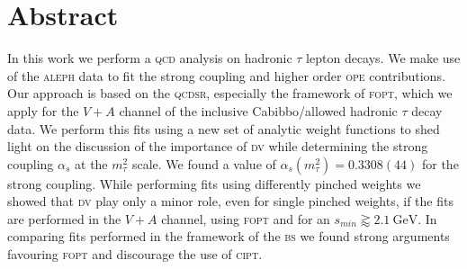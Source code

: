 \documentclass[../../index.tex]{subfiles}
\begin{document}
\chapter*{Abstract}
In this work we perform a \textsc{qcd} analysis on hadronic \(\tau\) lepton
decays. We make use of the \textsc{aleph} data to fit the strong coupling and
higher order \textsc{ope} contributions. Our approach is based on the
\textsc{qcdsr}, especially the framework of \textsc{fopt}, which we apply for
the \(V+A\) channel of the inclusive Cabibbo\-/allowed hadronic \(\tau\) decay
data. We perform this fits using a new set of analytic weight functions to shed
light on the discussion of the importance of \textsc{dv} while determining the
strong coupling \(\alpha_s\) at the \(m_\tau^2\) scale. We found a value of
\(\alpha_s(m_\tau^2) = 0.3308(44)\) for the strong coupling. While performing
fits using differently pinched weights we showed that \textsc{dv} play only a
minor role, even for single pinched weights, if the fits are performed in the
\(V+A\) channel, using \textsc{fopt} and for an \(s_{min} \gtrapprox
\SI{2.1}{\giga\eV}\). In comparing fits performed in the framework of the
\textsc{bs} we found strong arguments favouring \textsc{fopt} and discourage the
use of \textsc{cipt}.
\end{document}
